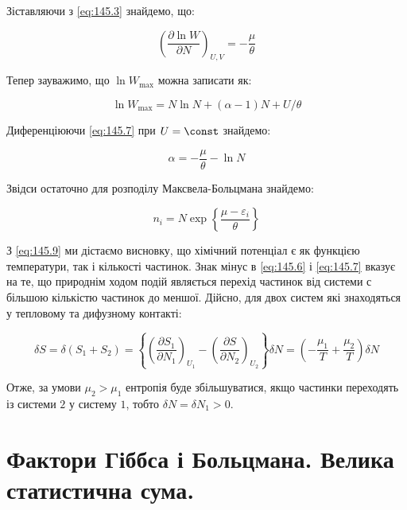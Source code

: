Зіставляючи з \eqref{eq:145.3} знайдемо, що:

\begin{equation}
	\left(\frac{\partial\ln{W}}{\partial N}\right)_{U,V}=-\frac{\mu}{\theta}
	\label{eq:145.7}
\end{equation}

Тепер зауважимо, що $\ln W_{\max}$ можна записати як:

\begin{equation}
	\ln{W_{\max}}=N\ln{N}+\left(\alpha-1\right)N+U/\theta
	\label{eq:145.8}
\end{equation}

Диференціюючи \eqref{eq:145.7} при $U = \const$ знайдемо:

\begin{equation}
	\alpha=-\frac{\mu}{\theta}-\ln{N}
	\label{eq:145.9}
\end{equation}

Звідси остаточно для розподілу Максвела-Больцмана знайдемо:

\begin{equation}
	n_i=N \exp\left\{\frac{\mu-\varepsilon_i}{\theta}\right\}
	\label{eq:145.10}
\end{equation}

З \eqref{eq:145.9} ми дістаємо висновку, що хімічний потенціал є як функцією температури, так і кількості частинок. Знак мінус в \eqref{eq:145.6} і \eqref{eq:145.7} вказує на те, що природнім ходом подій являється перехід частинок від системи с більшою кількістю частинок до меншої. Дійсно, для двох систем які знаходяться у тепловому та дифузному контакті:

\begin{equation}
	\delta S=\delta\left(S_1+S_2\right)=\left\{\left(\frac{{\partial S}_1}{\partial N_1}\right)_{U_1}-\left(\frac{\partial S}{\partial N_2}\right)_{U_2}\right\}\delta N=\left(-\frac{\mu_1}{T}+\frac{\mu_2}{T}\right)\delta N
	\label{eq:145.11}
\end{equation}

Отже, за умови $\mu_2 > \mu_1$ ентропія буде збільшуватися, якщо частинки переходять із системи $2$ у систему $1$, тобто $\delta N = \delta N_1 > 0$.

\section{Фактори Гіббса і Больцмана. Велика статистична сума.}


